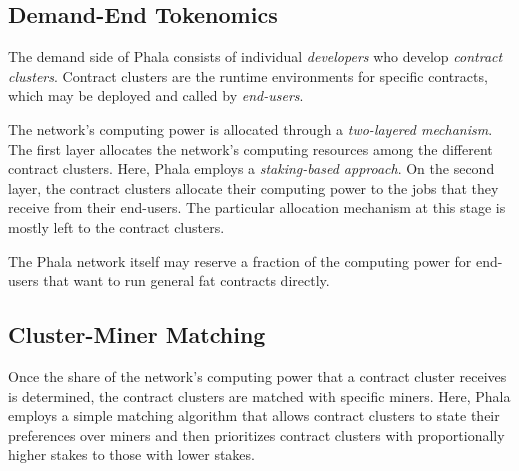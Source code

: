 \documentclass[11pt, a4paper, twocolumn]{article}
\begin{document}


\subsection{Demand-End Tokenomics} 

The demand side of Phala consists of individual \textit{developers} who develop \textit{contract clusters}. Contract clusters are the runtime environments for specific contracts, which may be deployed and called by \textit{end-users}. %

The network's computing power is allocated through a \textit{two-layered mechanism}. The first layer allocates the network's computing resources among the different contract clusters. Here, Phala employs a \textit{staking-based approach}. On the second layer, the contract clusters allocate their computing power to the jobs that they receive from their end-users. The particular allocation mechanism at this stage is mostly left to the contract clusters.

The Phala network itself may reserve a fraction of the computing power for end-users that want to run general fat contracts directly.

\subsection{Cluster-Miner Matching}
Once the share of the network's computing power that a contract cluster receives is determined, the contract clusters are matched with specific miners. Here, Phala employs a simple matching algorithm that allows contract clusters to state their preferences over miners and then prioritizes contract clusters with proportionally higher stakes to those with lower stakes.
\end{document}
